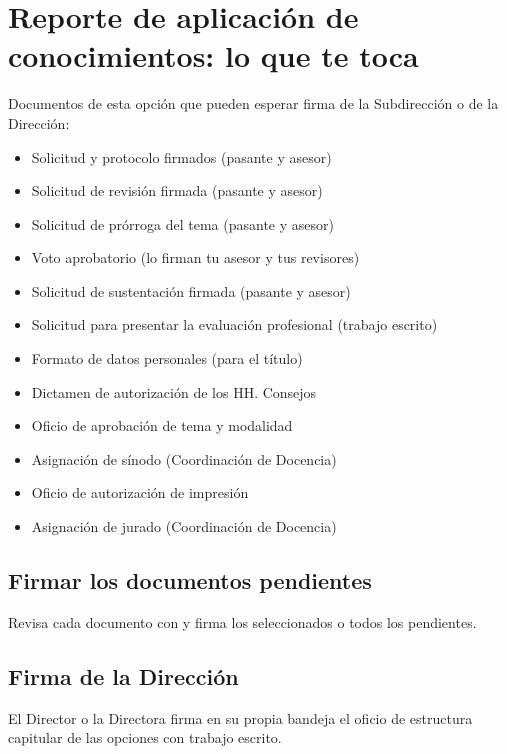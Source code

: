 \section{Reporte de aplicación de conocimientos: lo que te toca}
Documentos de esta opción que pueden esperar firma de la Subdirección o de la Dirección:
\begin{itemize}
  \item Solicitud y protocolo firmados (pasante y asesor)
  \item Solicitud de revisión firmada (pasante y asesor)
  \item Solicitud de prórroga del tema (pasante y asesor)
  \item Voto aprobatorio (lo firman tu asesor y tus revisores)
  \item Solicitud de sustentación firmada (pasante y asesor)
  \item Solicitud para presentar la evaluación profesional (trabajo escrito)
  \item Formato de datos personales (para el título)
  \item Dictamen de autorización de los HH. Consejos
  \item Oficio de aprobación de tema y modalidad
  \item Asignación de sínodo (Coordinación de Docencia)
  \item Oficio de autorización de impresión
  \item Asignación de jurado (Coordinación de Docencia)
\end{itemize}
\subsection{Firmar los documentos pendientes}
Revisa cada documento con  y firma los seleccionados o todos los pendientes.
\subsection{Firma de la Dirección}
El Director o la Directora firma en su propia bandeja el oficio de estructura capitular de las opciones con trabajo escrito.
